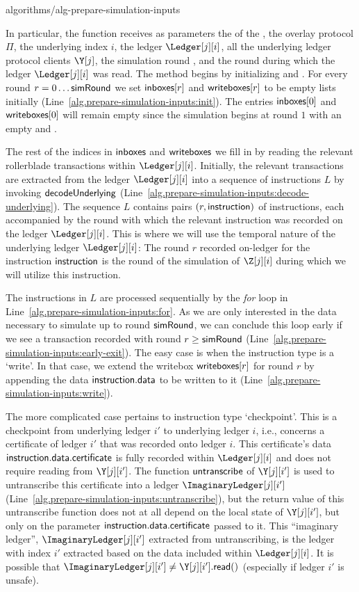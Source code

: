 {algorithms/alg-prepare-simulation-inputs}

In particular, the function \prepareSimulationInputs receives as parameters the \sid of the \rollerblade, the
overlay protocol $\Pi$, the underlying index $i$, the ledger $\Ledger[j][i]$, all the underlying ledger protocol clients $\Y[j]$,
the simulation round \simulationRound, and the round \realityRound during which the ledger $\Ledger[j][i]$ was read.
The method begins by initializing \inboxes and \writeboxes. For every round $r = 0 \ldots \textsf{simRound}$ we set
$\textsf{inboxes}[r]$ and $\textsf{writeboxes}[r]$ to be empty lists initially (Line~\ref{alg.prepare-simulation-inputs:init}).
The entries $\textsf{inboxes}[0]$ and $\textsf{writeboxes}[0]$ will remain empty
since the simulation begins at round $1$ with an empty \inbox and \writebox.

The rest of the indices in $\textsf{inboxes}$
and $\textsf{writeboxes}$ we fill in by reading the relevant rollerblade transactions within $\Ledger[j][i]$.
Initially, the relevant transactions are extracted from the ledger $\Ledger[j][i]$ into a sequence
of instructions $L$ by invoking $\textsf{decodeUnderlying}$ (Line~\ref{alg.prepare-simulation-inputs:decode-underlying}).
The sequence $L$ contains pairs $(r, \textsf{instruction})$ of instructions, each accompanied by the round with which
the relevant instruction was recorded on the ledger $\Ledger[j][i]$. This is where we will use the temporal
nature of the underlying ledger $\Ledger[j][i]$: The round $r$ recorded on-ledger for the instruction
$\textsf{instruction}$ is the round of the simulation of $\Z[j][i]$ during which we will utilize this instruction.

The instructions in $L$ are processed sequentially by the \emph{for} loop in Line~\ref{alg.prepare-simulation-inputs:for}.
As we are only interested in the data necessary to simulate up to round $\textsf{simRound}$, we can conclude this loop
early if we see a transaction recorded with round $r \geq \textsf{simRound}$ (Line~\ref{alg.prepare-simulation-inputs:early-exit}).
The easy case is when the instruction type is a `write'. In that case, we extend the writebox $\textsf{writeboxes}[r]$
for round $r$ by appending the data $\textsf{instruction}.\textsf{data}$ to be written to it (Line~\ref{alg.prepare-simulation-inputs:write}).

The more complicated case pertains to instruction type `checkpoint'. This is a checkpoint from underlying
ledger $i'$ to underlying ledger $i$, i.e., concerns a certificate of ledger $i'$ that was recorded onto
ledger $i$. This certificate's data $\textsf{instruction}.\textsf{data}.\textsf{certificate}$ is fully recorded within $\Ledger[j][i]$
and does not require reading from $\Y[j][i']$. The function $\textsf{untranscribe}$ of $\Y[j][i']$ is used to untranscribe
this certificate into a ledger $\ImaginaryLedger[j][i']$ (Line~\ref{alg.prepare-simulation-inputs:untranscribe}),
but the return value of this untranscribe function does not at all depend on the local state of $\Y[j][i']$,
but only on the parameter $\textsf{instruction}.\textsf{data}.\textsf{certificate}$ passed to it. This ``imaginary ledger'',
$\ImaginaryLedger[j][i']$ extracted from untranscribing, is the ledger with index $i'$ extracted
based on the data included within $\Ledger[j][i]$. It is possible that
$\ImaginaryLedger[j][i'] \neq \Y[j][i'].\lread()$ (especially if ledger $i'$ is unsafe).

